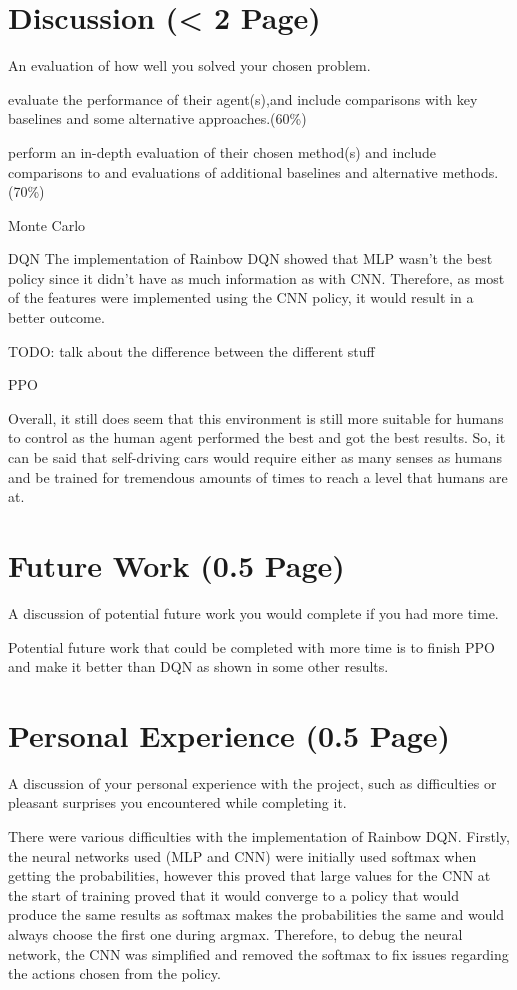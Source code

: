 \documentclass{article}
\begin{document}
\section{Discussion (< 2 Page)}
An evaluation of how well you solved your chosen problem.

evaluate the performance of their agent(s),and include comparisons with key baselines and some alternative approaches.(60\%)



perform an in-depth evaluation of their chosen method(s) and include comparisons to and evaluations of additional baselines and alternative methods.(70\%)

Monte Carlo

DQN
The implementation of Rainbow DQN showed that MLP wasn't the best policy since it didn't have as much information as with CNN.
Therefore, as most of the features were implemented using the CNN policy, it would result in a better outcome.

TODO: talk about the difference between the different stuff

PPO

Overall, it still does seem that this environment is still more suitable for humans to control as the human agent performed the best and got the best results.
So, it can be said that self-driving cars would require either as many senses as humans and be trained for tremendous amounts of times to reach a level that humans are at.




\section{Future Work (0.5 Page)}
A discussion of potential future work you would complete if you had more time.

Potential future work that could be completed with more time is to finish PPO and make it better than DQN as shown in some other results.



\section{Personal Experience (0.5 Page)}
A discussion of your personal experience with the project, such as difficulties or pleasant surprises you encountered while completing it.

There were various difficulties with the implementation of Rainbow DQN.
Firstly, the neural networks used (MLP and CNN) were initially used softmax when getting the probabilities, however this proved that large values for the CNN at the start of training proved that it would converge to a policy that would produce the same results as softmax makes the probabilities the same and would always choose the first one during argmax.
Therefore, to debug the neural network, the CNN was simplified and removed the softmax to fix issues regarding the actions chosen from the policy.
\end{document}
